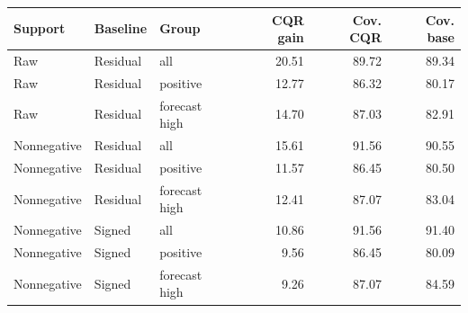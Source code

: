 \begin{tabular}{lllrrr}
\toprule
Support & Baseline & Group & CQR gain & Cov. CQR & Cov. base \\
\midrule
Raw & Residual & all & 20.51 & 89.72 & 89.34 \\
Raw & Residual & positive & 12.77 & 86.32 & 80.17 \\
Raw & Residual & forecast high & 14.70 & 87.03 & 82.91 \\
Nonnegative & Residual & all & 15.61 & 91.56 & 90.55 \\
Nonnegative & Residual & positive & 11.57 & 86.45 & 80.50 \\
Nonnegative & Residual & forecast high & 12.41 & 87.07 & 83.04 \\
Nonnegative & Signed & all & 10.86 & 91.56 & 91.40 \\
Nonnegative & Signed & positive & 9.56 & 86.45 & 80.09 \\
Nonnegative & Signed & forecast high & 9.26 & 87.07 & 84.59 \\
\bottomrule
\end{tabular}
